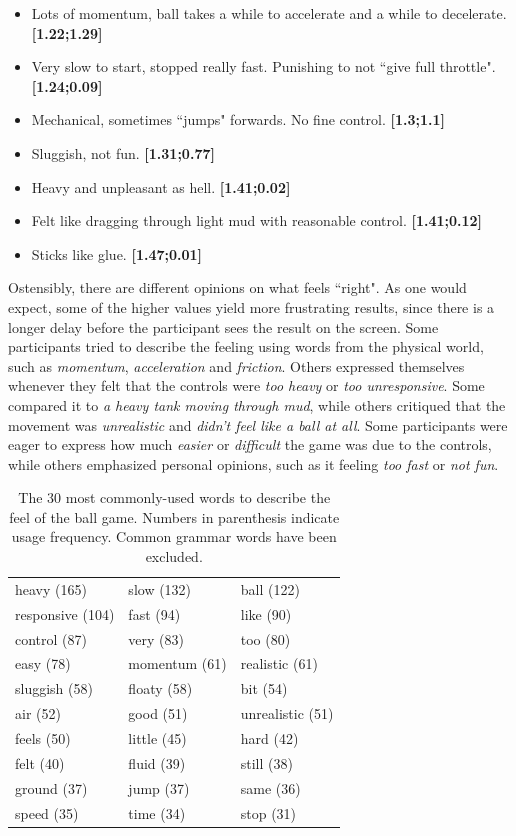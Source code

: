 \begin{itemize}[noitemsep,nolistsep]
\item Lots of momentum, ball takes a while to accelerate and a while to decelerate. \textbf{[1.22;1.29]}
\item Very slow to start, stopped really fast. Punishing to not ``give full throttle". \textbf{[1.24;0.09]}
\item Mechanical, sometimes ``jumps" forwards. No fine control. \textbf{[1.3;1.1]}
\item Sluggish, not fun. \textbf{[1.31;0.77]}
\item Heavy and unpleasant as hell. \textbf{[1.41;0.02]}
\item Felt like dragging through light mud with reasonable control. \textbf{[1.41;0.12]}
\item Sticks like glue. \textbf{[1.47;0.01]}
\end{itemize}

Ostensibly, there are different opinions on what feels ``right". As one would expect, some of the higher values yield more frustrating results, since there is a longer delay before the participant sees the result on the screen. Some participants tried to describe the feeling using words from the physical world, such as \textit{momentum}, \textit{acceleration} and \textit{friction}. Others expressed themselves whenever they felt that the controls were \textit{too heavy} or \textit{too unresponsive}. Some compared it to \textit{a heavy tank moving through mud}, while others critiqued that the movement was \textit{unrealistic} and \textit{didn't feel like a ball at all}. Some participants were eager to express how much \textit{easier} or \textit{difficult} the game was due to the controls, while others emphasized personal opinions, such as it feeling \textit{too fast} or \textit{not fun}.

\begin{table} \centering
\caption{The 30 most commonly-used words to describe the feel of the ball game. Numbers in parenthesis indicate usage frequency. Common grammar words have been excluded.}
\label{table:mostWords}
\begin{tabular}{lll}
\toprule
heavy (165) & slow (132) & ball (122)\\
responsive (104) & fast (94) & like (90)\\
control (87) & very (83) & too (80)\\ 
easy (78) & momentum (61) & realistic (61)\\
sluggish (58) & floaty (58) & bit (54)\\
air  (52) & good (51) & unrealistic (51)\\
feels (50) & little (45) & hard (42)\\
felt (40) & fluid (39) & still (38)\\
ground (37) & jump (37) & same (36)\\
speed (35) & time (34) & stop (31)\\
\bottomrule
\end{tabular}
\end{table}

